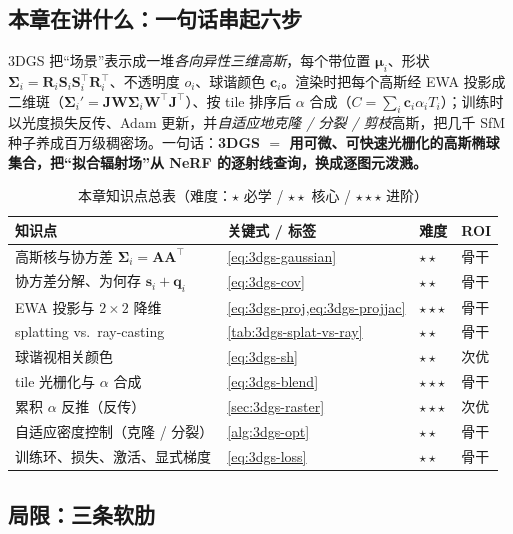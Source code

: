 \subsection{本章在讲什么：一句话串起六步}

3DGS 把“场景”表示成一堆\emph{各向异性三维高斯}，每个带位置 $\boldsymbol\mu_i$、形状 $\boldsymbol\Sigma_i=\mathbf R_i\mathbf S_i\mathbf S_i^\top\mathbf R_i^\top$、不透明度 $o_i$、球谐颜色 $\mathbf c_i$。渲染时把每个高斯经 EWA 投影成二维斑（$\boldsymbol\Sigma_i'=\mathbf J\mathbf W\boldsymbol\Sigma_i\mathbf W^\top\mathbf J^\top$）、按 tile 排序后 $\alpha$ 合成（$C=\sum_i\mathbf c_i\alpha_i T_i$）；训练时以光度损失反传、Adam 更新，并\emph{自适应地克隆 / 分裂 / 剪枝}高斯，把几千 SfM 种子养成百万级稠密场。一句话：\textbf{3DGS $=$ 用可微、可快速光栅化的高斯椭球集合，把“拟合辐射场”从 NeRF 的逐射线查询，换成逐图元泼溅。}

\begin{table}[H]\centering
\caption{本章知识点总表（难度：$\star$ 必学 / $\star\star$ 核心 / $\star\star\star$ 进阶）}
\label{tab:3dgs-summary}
\small
\begin{tabular}{@{}llll@{}}
\toprule
知识点 & 关键式 / 标签 & 难度 & ROI \\
\midrule
高斯核与协方差 $\boldsymbol\Sigma_i=\mathbf A\mathbf A^\top$ & \cref{eq:3dgs-gaussian} & $\star\star$ & 骨干 \\
协方差分解、为何存 $\mathbf s_i+\mathbf q_i$ & \cref{eq:3dgs-cov} & $\star\star$ & 骨干 \\
EWA 投影与 $2\times2$ 降维 & \cref{eq:3dgs-proj,eq:3dgs-projjac} & $\star\star\star$ & 骨干 \\
splatting vs.\ ray-casting & \cref{tab:3dgs-splat-vs-ray} & $\star\star$ & 骨干 \\
球谐视相关颜色 & \cref{eq:3dgs-sh} & $\star\star$ & 次优 \\
tile 光栅化与 $\alpha$ 合成 & \cref{eq:3dgs-blend} & $\star\star\star$ & 骨干 \\
累积 $\alpha$ 反推（反传） & \cref{sec:3dgs-raster} & $\star\star\star$ & 次优 \\
自适应密度控制（克隆 / 分裂） & \cref{alg:3dgs-opt} & $\star\star$ & 骨干 \\
训练环、损失、激活、显式梯度 & \cref{eq:3dgs-loss} & $\star\star$ & 骨干 \\
\bottomrule
\end{tabular}
\end{table}

\subsection{局限：三条软肋}

